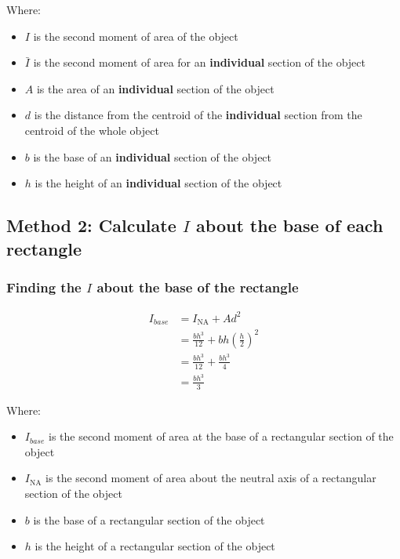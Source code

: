 \documentclass[11pt]{article}
\begin{document}
Where:
\begin{itemize}
\item \(I\) is the second moment of area of the object
\item \(\bar{I}\) is the second moment of area for an \textbf{individual} section of the object
\item \(A\) is the area of an \textbf{individual} section of the object
\item \(d\) is the distance from the centroid of the \textbf{individual} section from the centroid of the whole object
\item \(b\) is the base of an \textbf{individual} section of the object
\item \(h\) is the height of an \textbf{individual} section of the object
\end{itemize}

\newpage
\subsection{Method 2: Calculate \(I\) about the base of each rectangle}
\label{sec:orgf2db213}

\subsubsection{Finding the \(I\) about the base of the rectangle}
\label{sec:orgd19a828}
\begin{align*}
I_{base} &= I_{\text{NA}} + Ad^2 \\
&= \frac{bh^3}{12} + bh \left( \frac{h}{2} \right)^2 \\
&= \frac{bh^3}{12} + \frac{bh^3}{4} \\
&= \frac{bh^3}{3}
\end{align*}

Where:
\begin{itemize}
\item \(I_{base}\) is the second moment of area at the base of a rectangular section of the object
\item \(I_{\text{NA}}\) is the second moment of area about the neutral axis of a rectangular section of the object
\item \(b\) is the base of a rectangular section of the object
\item \(h\) is the height of a rectangular section of the object
\end{itemize}
\end{document}
